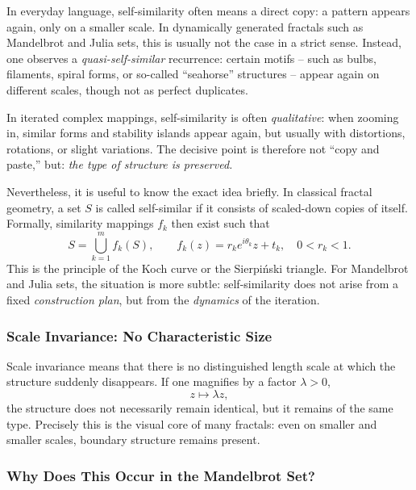 In everyday language, self-similarity often means a direct copy:
a pattern appears again, only on a smaller scale.
In dynamically generated fractals such as Mandelbrot and Julia sets,
this is usually not the case in a strict sense.
Instead, one observes a \emph{quasi-self-similar} recurrence:
certain motifs -- such as bulbs, filaments, spiral forms, or so-called ``seahorse'' structures --
appear again on different scales,
though not as perfect duplicates.

\begin{DidacticBox}
	\label{box:copy}
	\small
	In iterated complex mappings, self-similarity is often \emph{qualitative}:
	when zooming in, similar forms and stability islands appear again,
	but usually with distortions, rotations, or slight variations.
	The decisive point is therefore not ``copy and paste,''
	but:
	\emph{the type of structure is preserved.}
\end{DidacticBox}

Nevertheless, it is useful to know the exact idea briefly.
In classical fractal geometry, a set \(S\) is called self-similar
if it consists of scaled-down copies of itself.
Formally, similarity mappings \(f_k\) then exist such that
\[
S=\bigcup_{k=1}^m f_k(S),\qquad
f_k(z)=r_k e^{i\theta_k}z+t_k,\quad 0<r_k<1.
\]
This is the principle of the Koch curve or the Sierpiński triangle.
For Mandelbrot and Julia sets, the situation is more subtle:
self-similarity does not arise from a fixed \emph{construction plan},
but from the \emph{dynamics} of the iteration.

\subsubsection*{Scale Invariance: No Characteristic Size}

Scale invariance means
that there is no distinguished length scale
at which the structure suddenly disappears.
If one magnifies by a factor \(\lambda>0\),
\[
z \mapsto \lambda z,
\]
the structure does not necessarily remain identical,
but it remains of the same type.
Precisely this is the visual core of many fractals:
even on smaller and smaller scales, boundary structure remains present.

\subsubsection*{Why Does This Occur in the Mandelbrot Set?}


